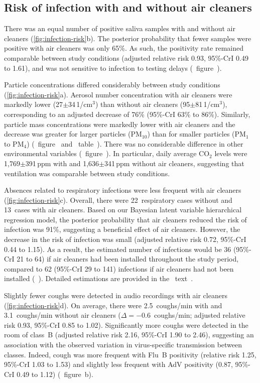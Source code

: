 \documentclass[fleqn,11pt]{wlscirep}
\begin{document}
\subsection{Risk of infection with and without air cleaners}

There was an equal number of positive saliva samples with and without air cleaners (\cref{fig:infection-risk}b). The posterior probability that fewer samples were positive with air cleaners was only 65\%. As such, the positivity rate remained comparable between study conditions (adjusted relative risk 0.93, 95\%-CrI 0.49 to 1.61), and was not sensitive to infection to testing delays (\supp~figure~).

Particle concentrations differed considerably between study conditions (\cref{fig:infection-risk}a). Aerosol number concentration with air cleaners were markedly lower (27$\pm$34\,1/cm$^3$) than without air cleaners (95$\pm$81\,1/cm$^3$), corresponding to an adjusted decrease of 76\% (95\%-CrI 63\% to 86\%). Similarly, particle mass concentrations were markedly lower with air cleaners and the decrease was greater for larger particles (PM$_{10}$) than for smaller particles (PM$_1$ to PM$_{4}$) (\supp~figure~ and \supp~table~). There was no considerable difference in other environmental variables (\supp~figure~). In particular, daily average CO$_2$ levels were 1,769$\pm$391\,ppm with and 1,636$\pm$341\,ppm without air cleaners, suggesting that ventilation was comparable between study conditions.

Absences related to respiratory infections were less frequent with air cleaners (\cref{fig:infection-risk}c). Overall, there were 22~respiratory cases without and 13~cases with air cleaners. Based on our Bayesian latent variable hierarchical regression model, the posterior probability that air cleaners reduced the risk of infection was 91\%, suggesting a beneficial effect of air cleaners. However, the decrease in the risk of infection was small (adjusted relative risk 0.72, 95\%-CrI 0.44 to 1.15). As a result, the estimated number of infections would be 36 (95\%-CrI 21 to 64) if air cleaners had been installed throughout the study period, compared to 62 (95\%-CrI 29 to 141) infections if air cleaners had not been installed (\supp~). Detailed estimations are provided in the \supp~text~. 

Slightly fewer coughs were detected in audio recordings with air cleaners (\cref{fig:infection-risk}d). On average, there were 2.5~coughs/min with and 3.1~coughs/min without air cleaners ($\Delta=-$0.6~coughs/min; adjusted relative risk 0.93, 95\%-CrI 0.85 to 1.02). Significantly more coughs were detected in the room of class~B (adjusted relative risk 2.16, 95\%-CrI 1.90 to 2.46), suggesting an association with the observed variation in virus-specific transmission between classes. Indeed, cough was more frequent with Flu~B positivity (relative risk 1.25, 95\%-CrI 1.03 to 1.53) and slightly less frequent with AdV positivity (0.87, 95\%-CrI 0.49 to 1.12) (\supp~figure~b). 
\end{document}
